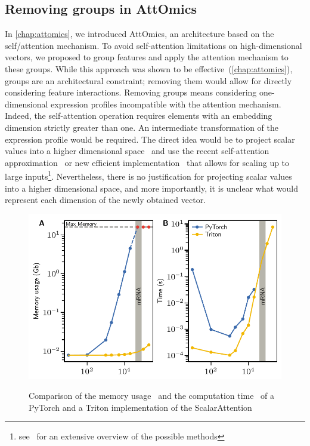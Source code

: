 \documentclass[../main.tex]{subfiles}
\begin{document}
	\subsection{Removing groups in AttOmics}\label{sec:scalar_attention}
		In \cref{chap:attomics}, we introduced AttOmics, an architecture based on the self\-/attention mechanism.
		To avoid self-attention limitations on high-dimensional vectors, we proposed to group features and apply the attention mechanism to these groups.
		While this approach was shown to be effective~(\cref{chap:attomics}), groups are an architectural constraint; removing them would allow for directly considering feature interactions.
		Removing groups means considering one-dimensional expression profiles incompatible with the attention mechanism.
		Indeed, the self-attention operation requires elements with an embedding dimension strictly greater than one.
		An intermediate transformation of the expression profile would be required.
		The direct idea would be to project scalar values into a higher dimensional space~\cite{gorishniy2021revisiting} and use the recent self-attention approximation~\cite{xiongNystrOmformerNystr2021,Linformer} or new efficient implementation~\cite{FlashAttention,rabeSelfattentionDoesNot2021,bolyaHydraAttentionEfficient2022a} that allows for scaling up to large inputs\footnote{see~\cite{EfficientTransformers} for an extensive overview of the possible methods}.
		Nevertheless, there is no justification for projecting scalar values into a higher dimensional space, and more importantly, it is unclear what would represent each dimension of the newly obtained vector.

		\begin{figure}[htbp]
			\centering
			\begin{subcaptiongroup}
				\includegraphics{ScalarAttentionBenchmark.pdf}
				\label{fig:lin_attention_benchA}
				\label{fig:lin_attention_benchB}
			\end{subcaptiongroup}
			\caption[Comparison of two ScalarAttention implementation]{Comparison of the memory usage~ and the computation time~ of a \textcolor[HTML]{3969AC}{PyTorch} and a \textcolor[HTML]{F2B701}{Triton} implementation of the ScalarAttention}
			\label{fig:lin_attention_bench}
		\end{figure}
\end{document}

